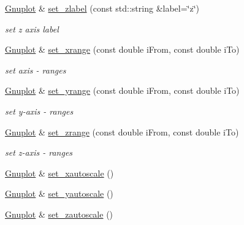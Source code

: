 \begin{DoxyCompactItemize}
\mbox{\label{class_gnuplot_ab3206e715d20f05cc0dd1eec89ce8b07}} 
\hyperlink{class_gnuplot}{Gnuplot} \& \hyperlink{class_gnuplot_ab3206e715d20f05cc0dd1eec89ce8b07}{set\+\_\+zlabel} (const std\+::string \&label=\char`\"{}z\char`\"{})
\begin{DoxyCompactList}\small\item\em set z axis label \end{DoxyCompactList}\item 
\mbox{\label{class_gnuplot_a4b8d96018f2d2d4e2922d4df153d6a84}} 
\hyperlink{class_gnuplot}{Gnuplot} \& \hyperlink{class_gnuplot_a4b8d96018f2d2d4e2922d4df153d6a84}{set\+\_\+xrange} (const double i\+From, const double i\+To)
\begin{DoxyCompactList}\small\item\em set axis -\/ ranges \end{DoxyCompactList}\item 
\mbox{\label{class_gnuplot_a461271b7bfd4f84bdfc0055457226f28}} 
\hyperlink{class_gnuplot}{Gnuplot} \& \hyperlink{class_gnuplot_a461271b7bfd4f84bdfc0055457226f28}{set\+\_\+yrange} (const double i\+From, const double i\+To)
\begin{DoxyCompactList}\small\item\em set y-\/axis -\/ ranges \end{DoxyCompactList}\item 
\mbox{\label{class_gnuplot_a7273f6a48024117b4d234d0251106e78}} 
\hyperlink{class_gnuplot}{Gnuplot} \& \hyperlink{class_gnuplot_a7273f6a48024117b4d234d0251106e78}{set\+\_\+zrange} (const double i\+From, const double i\+To)
\begin{DoxyCompactList}\small\item\em set z-\/axis -\/ ranges \end{DoxyCompactList}\item 
\hyperlink{class_gnuplot}{Gnuplot} \& \hyperlink{class_gnuplot_a11a62a04c203f01607c3c21a727e318d}{set\+\_\+xautoscale} ()
\item 
\hyperlink{class_gnuplot}{Gnuplot} \& \hyperlink{class_gnuplot_a5b9e1a4e68f94d418a8e9194f168b448}{set\+\_\+yautoscale} ()
\item 
\hyperlink{class_gnuplot}{Gnuplot} \& \hyperlink{class_gnuplot_aef3e84e793836158e1ddd773d1465c37}{set\+\_\+zautoscale} ()
\item 

\end{DoxyCompactItemize}
